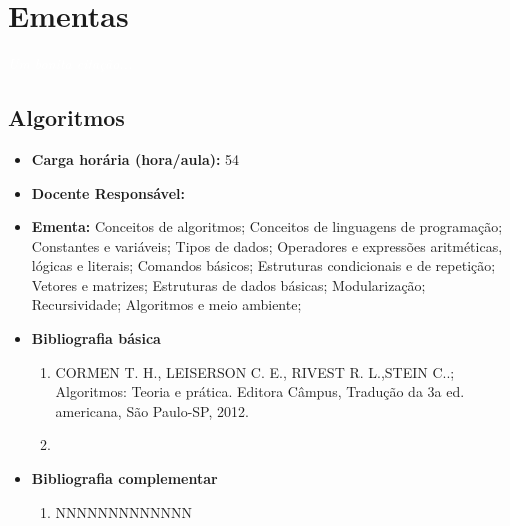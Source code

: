 \documentclass[11pt,fleqn]{book} %
\begin{document}
\chapter{Ementas}\label{ementas}
\vspace{6em}
\begin{flushright}
	\textit{\textcolor{white}{Um bonita citação...}}
\end{flushright}
\vspace{12em}


\newpage
\section{Algoritmos}\label{disc:algoritmos}

\begin{itemize}
	\item \textbf{Carga horária (hora/aula):} 54
	\item \textbf{Docente Responsável:}~
	\item \textbf{Ementa:} 
	Conceitos de algoritmos;
	Conceitos de linguagens de programação;
	Constantes e variáveis;
	Tipos de dados;
	Operadores e expressões aritméticas, lógicas e literais; 
	Comandos básicos;
	Estruturas condicionais e de repetição;
	Vetores e matrizes;
	Estruturas de dados básicas;
	Modularização;
	Recursividade;
	Algoritmos e meio ambiente;
	\item \textbf{Bibliografia básica}
	\begin{enumerate}
		\item CORMEN T. H., LEISERSON C. E., RIVEST R. L.,STEIN C..; Algoritmos: Teoria e prática. Editora Câmpus, Tradução da 3a ed. americana, São Paulo-SP, 2012.
		\item 
	\end{enumerate}
	\item \textbf{Bibliografia complementar}
	\begin{enumerate}
		\item NNNNNNNNNNNNN
	\end{enumerate}	
\end{itemize}



\end{document}
